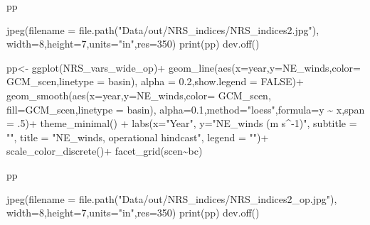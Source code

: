 \documentclass[
]{article}
\newenvironment{Shaded}{\begin{snugshade}}{\end{snugshade}}
\newcommand{\AttributeTok}[1]{\textcolor[rgb]{0.77,0.63,0.00}{#1}}
\newcommand{\ConstantTok}[1]{\textcolor[rgb]{0.00,0.00,0.00}{#1}}
\newcommand{\DecValTok}[1]{\textcolor[rgb]{0.00,0.00,0.81}{#1}}
\newcommand{\FloatTok}[1]{\textcolor[rgb]{0.00,0.00,0.81}{#1}}
\newcommand{\FunctionTok}[1]{\textcolor[rgb]{0.00,0.00,0.00}{#1}}
\newcommand{\NormalTok}[1]{#1}
\newcommand{\OtherTok}[1]{\textcolor[rgb]{0.56,0.35,0.01}{#1}}
\newcommand{\SpecialCharTok}[1]{\textcolor[rgb]{0.00,0.00,0.00}{#1}}
\newcommand{\StringTok}[1]{\textcolor[rgb]{0.31,0.60,0.02}{#1}}
\begin{document}
\begin{Shaded}
\begin{Highlighting}[]
\NormalTok{     pp}
     
     \FunctionTok{jpeg}\NormalTok{(}\AttributeTok{filename =} \FunctionTok{file.path}\NormalTok{(}\StringTok{"Data/out/NRS\_indices/NRS\_indices2.jpg"}\NormalTok{),}
          \AttributeTok{width=}\DecValTok{8}\NormalTok{,}\AttributeTok{height=}\DecValTok{7}\NormalTok{,}\AttributeTok{units=}\StringTok{"in"}\NormalTok{,}\AttributeTok{res=}\DecValTok{350}\NormalTok{)}
     \FunctionTok{print}\NormalTok{(pp)}
     \FunctionTok{dev.off}\NormalTok{()}
     
     
\NormalTok{     pp}\OtherTok{\textless{}{-}} \FunctionTok{ggplot}\NormalTok{(NRS\_vars\_wide\_op)}\SpecialCharTok{+}
        \FunctionTok{geom\_line}\NormalTok{(}\FunctionTok{aes}\NormalTok{(}\AttributeTok{x=}\NormalTok{year,}\AttributeTok{y=}\NormalTok{NE\_winds,}\AttributeTok{color=}\NormalTok{ GCM\_scen,}\AttributeTok{linetype =}\NormalTok{ basin),}
                  \AttributeTok{alpha =} \FloatTok{0.2}\NormalTok{,}\AttributeTok{show.legend =} \ConstantTok{FALSE}\NormalTok{)}\SpecialCharTok{+}
        \FunctionTok{geom\_smooth}\NormalTok{(}\FunctionTok{aes}\NormalTok{(}\AttributeTok{x=}\NormalTok{year,}\AttributeTok{y=}\NormalTok{NE\_winds,}\AttributeTok{color=}\NormalTok{ GCM\_scen,}
                        \AttributeTok{fill=}\NormalTok{GCM\_scen,}\AttributeTok{linetype =}\NormalTok{ basin),}
                    \AttributeTok{alpha=}\FloatTok{0.1}\NormalTok{,}\AttributeTok{method=}\StringTok{"loess"}\NormalTok{,}\AttributeTok{formula=}\StringTok{\textquotesingle{}y \textasciitilde{} x\textquotesingle{}}\NormalTok{,}\AttributeTok{span =}\NormalTok{ .}\DecValTok{5}\NormalTok{)}\SpecialCharTok{+}
        \FunctionTok{theme\_minimal}\NormalTok{() }\SpecialCharTok{+} 
        \FunctionTok{labs}\NormalTok{(}\AttributeTok{x=}\StringTok{"Year"}\NormalTok{,}
             \AttributeTok{y=}\StringTok{"NE\_winds (m s\^{}{-}1)"}\NormalTok{,}
             \AttributeTok{subtitle =} \StringTok{""}\NormalTok{,}
             \AttributeTok{title =} \StringTok{"NE\_winds, operational hindcast"}\NormalTok{,}
             \AttributeTok{legend =} \StringTok{""}\NormalTok{)}\SpecialCharTok{+}
        \FunctionTok{scale\_color\_discrete}\NormalTok{()}\SpecialCharTok{+} \FunctionTok{facet\_grid}\NormalTok{(scen}\SpecialCharTok{\textasciitilde{}}\NormalTok{bc)}
     
\NormalTok{     pp}
     
     \FunctionTok{jpeg}\NormalTok{(}\AttributeTok{filename =} \FunctionTok{file.path}\NormalTok{(}\StringTok{"Data/out/NRS\_indices/NRS\_indices2\_op.jpg"}\NormalTok{),}
          \AttributeTok{width=}\DecValTok{8}\NormalTok{,}\AttributeTok{height=}\DecValTok{7}\NormalTok{,}\AttributeTok{units=}\StringTok{"in"}\NormalTok{,}\AttributeTok{res=}\DecValTok{350}\NormalTok{)}
     \FunctionTok{print}\NormalTok{(pp)}
     \FunctionTok{dev.off}\NormalTok{()}
    

\end{Highlighting}
\end{Shaded}
\end{document}
